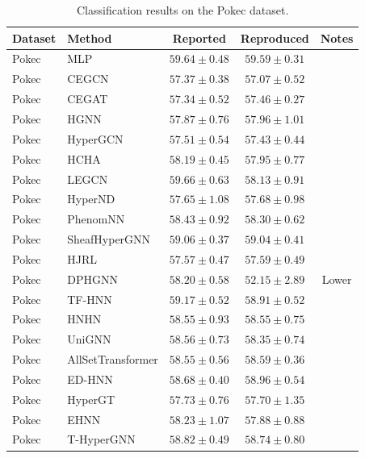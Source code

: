 \vspace{3em}

\begin{table}[H]
    \centering \small
    \renewcommand{\arraystretch}{1.12} 
    \begin{tabular}{llccc}
        \toprule
        Dataset & Method & Reported & Reproduced & Notes \\
        \midrule
        Pokec & MLP & \(59.64 \pm 0.48\) & \(59.59 \pm 0.31\) & \\
        Pokec & CEGCN & \(57.37 \pm 0.38\) & \(57.07 \pm 0.52\) & \\
        Pokec & CEGAT & \(57.34 \pm 0.52\) & \(57.46 \pm 0.27\) & \\
        \grprule
        Pokec & HGNN & \(57.87 \pm 0.76\) & \(57.96 \pm 1.01\) & \\
        Pokec & HyperGCN & \(57.51 \pm 0.54\) & \(57.43 \pm 0.44\) & \\
        Pokec & HCHA & \(58.19 \pm 0.45\) & \(57.95 \pm 0.77\) & \\
        Pokec & LEGCN & \(59.66 \pm 0.63\) & \(58.13 \pm 0.91\) & \\
        Pokec & HyperND & \(57.65 \pm 1.08\) & \(57.68 \pm 0.98\) & \\
        Pokec & PhenomNN & \(58.43 \pm 0.92\) & \(58.30 \pm 0.62\) & \\
        Pokec & SheafHyperGNN & \(59.06 \pm 0.37\) & \(59.04 \pm 0.41\) & \\
        Pokec & HJRL & \(57.57 \pm 0.47\) & \(57.59 \pm 0.49\) & \\
        Pokec & DPHGNN & \(58.20 \pm 0.58\) & \(52.15 \pm 2.89\) & Lower \\
        Pokec & TF-HNN & \(59.17 \pm 0.52\) & \(58.91 \pm 0.52\) & \\
        \grprule
        Pokec & HNHN & \(58.55 \pm 0.93\) & \(58.55 \pm 0.75\) & \\
        Pokec & UniGNN & \(58.56 \pm 0.73\) & \(58.35 \pm 0.74\) & \\
        Pokec & AllSetTransformer & \(58.55 \pm 0.56\) & \(58.59 \pm 0.36\) & \\
        Pokec & ED-HNN & \(58.68 \pm 0.40\) & \(58.96 \pm 0.54\) & \\
        Pokec & HyperGT & \(57.73 \pm 0.76\) & \(57.70 \pm 1.35\) & \\
        \grprule
        Pokec & EHNN & \(58.23 \pm 1.07\) & \(57.88 \pm 0.88\) & \\
        Pokec & T-HyperGNN & \(58.82 \pm 0.49\) & \(58.74 \pm 0.80\) & \\
        \bottomrule
    \end{tabular}
    \caption{Classification results on the Pokec dataset.}
\end{table}

